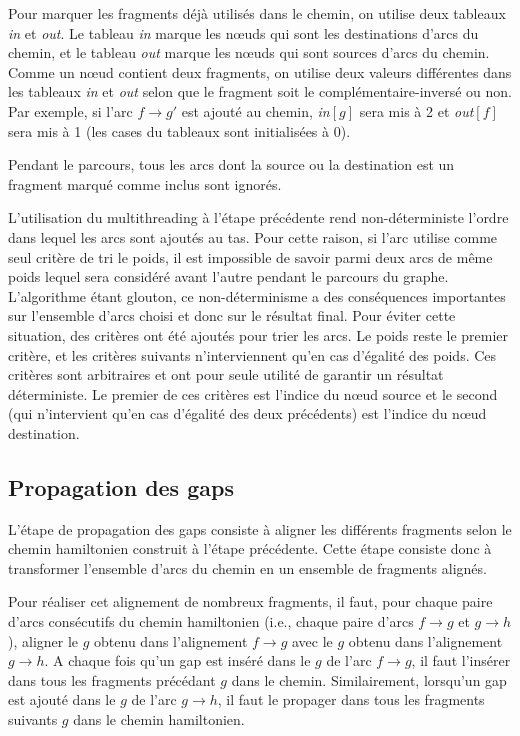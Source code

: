 \documentclass{article}
\begin{document}
Pour marquer les fragments déjà utilisés dans le chemin, on utilise deux tableaux \textit{in} et \textit{out}. Le tableau \textit{in} marque les nœuds qui sont les destinations d'arcs du chemin, et le tableau \textit{out} marque les nœuds qui sont sources d'arcs du chemin. Comme un nœud contient deux fragments, on utilise deux valeurs différentes dans les tableaux \textit{in} et \textit{out} selon que le fragment soit le complémentaire-inversé ou non. Par exemple, si l'arc $f \to g'$ est ajouté au chemin, \textit{in}$[g]$ sera mis à 2 et \textit{out}$[f]$ sera mis à 1 (les cases du tableaux sont initialisées à 0).

Pendant le parcours, tous les arcs dont la source ou la destination est un fragment marqué comme inclus sont ignorés.

L'utilisation du multithreading à l'étape précédente rend non-déterministe l'ordre dans lequel les arcs sont ajoutés au tas. Pour cette raison, si l'arc utilise comme seul critère de tri le poids, il est impossible de savoir parmi deux arcs de même poids lequel sera considéré avant l'autre pendant le parcours du graphe. L'algorithme étant glouton, ce non-déterminisme a des conséquences importantes sur l'ensemble d'arcs choisi et donc sur le résultat final. Pour éviter cette situation, des critères ont été ajoutés pour trier les arcs. Le poids reste le premier critère, et les critères suivants n'interviennent qu'en cas d'égalité des poids. Ces critères sont arbitraires et ont pour seule utilité de garantir un résultat déterministe. Le premier de ces critères est l'indice du nœud source et le second (qui n'intervient qu'en cas d'égalité des deux précédents) est l'indice du nœud destination.

\newpage
\subsection{Propagation des gaps}

L'étape de propagation des gaps consiste à aligner les différents fragments selon le chemin hamiltonien construit à l'étape précédente. Cette étape consiste donc à transformer l'ensemble d'arcs du chemin en un ensemble de fragments alignés. 

Pour réaliser cet alignement de nombreux fragments, il faut, pour chaque paire d'arcs consécutifs du chemin hamiltonien (i.e., chaque paire d'arcs $f \to g$ et $g \to h$), aligner le $g$ obtenu dans l'alignement $f \to g$ avec le $g$ obtenu dans l'alignement $g \to h$. A chaque fois qu'un gap est inséré dans le $g$ de l'arc $f \to g$, il faut l'insérer dans tous les fragments précédant $g$ dans le chemin. Similairement, lorsqu'un gap est ajouté dans le $g$ de l'arc $g \to h$, il faut le propager dans tous les fragments suivants $g$ dans le chemin hamiltonien. 
\end{document}
